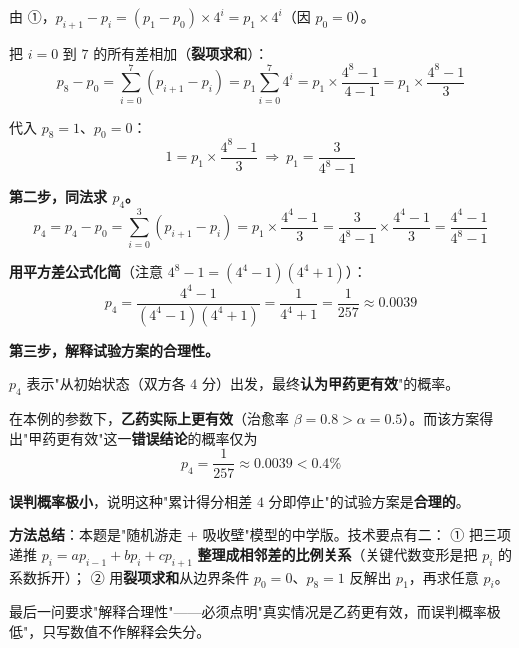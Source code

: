 \begin{answer}
由 ①，$p_{i+1}-p_i=\left(p_1-p_0\right)\times4^{i}=p_1\times4^{i}$（因 $p_0=0$）。

把 $i=0$ 到 $7$ 的所有差相加（\textbf{裂项求和}）：
\nopagebreak[4]
\[p_8-p_0=\sum_{i=0}^{7}\left(p_{i+1}-p_i\right)=p_1\sum_{i=0}^{7}4^{i}=p_1\times\frac{4^{8}-1}{4-1}=p_1\times\frac{4^{8}-1}3\]

代入 $p_8=1$、$p_0=0$：
\nopagebreak[4]
\[1=p_1\times\frac{4^{8}-1}3\ \Longrightarrow\ p_1=\frac3{4^{8}-1}\]

\textbf{第二步，同法求 $p_4$。}
\nopagebreak[4]
\[p_4=p_4-p_0=\sum_{i=0}^{3}\left(p_{i+1}-p_i\right)=p_1\times\frac{4^{4}-1}3=\frac3{4^{8}-1}\times\frac{4^{4}-1}3=\frac{4^{4}-1}{4^{8}-1}\]

\textbf{用平方差公式化简}（注意 $4^{8}-1=\left(4^{4}-1\right)\left(4^{4}+1\right)$）：
\nopagebreak[4]
\[p_4=\frac{4^{4}-1}{\left(4^{4}-1\right)\left(4^{4}+1\right)}=\frac1{4^{4}+1}=\frac1{257}\approx0.0039\]

\textbf{第三步，解释试验方案的合理性。}

$p_4$ 表示"从初始状态（双方各 $4$ 分）出发，最终\textbf{认为甲药更有效}"的概率。

在本例的参数下，\textbf{乙药实际上更有效}（治愈率 $\beta=0.8>\alpha=0.5$）。而该方案得出"甲药更有效"这一\textbf{错误结论}的概率仅为
\nopagebreak[4]
\[p_4=\frac1{257}\approx0.0039<0.4\%\]

\textbf{误判概率极小}，说明这种"累计得分相差 $4$ 分即停止"的试验方案是\textbf{合理的}。

\begin{gktip}
\textbf{方法总结}：本题是"随机游走 + 吸收壁"模型的中学版。技术要点有二：
① 把三项递推 $p_i=ap_{i-1}+bp_i+cp_{i+1}$ \textbf{整理成相邻差的比例关系}（关键代数变形是把 $p_i$ 的系数拆开）；
② 用\textbf{裂项求和}从边界条件 $p_0=0$、$p_8=1$ 反解出 $p_1$，再求任意 $p_i$。

最后一问要求"解释合理性"——必须点明"真实情况是乙药更有效，而误判概率极低"，只写数值不作解释会失分。
\end{gktip}



\par\medskip

\end{answer}

